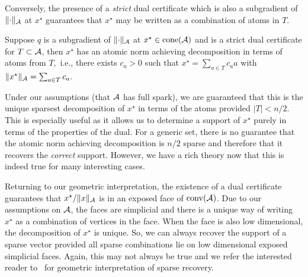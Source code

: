 Conversely, the presence of a \emph{strict} dual certificate which is also a
subgradient of $\lVert\cdot\rVert_{\mathcal{A}}$ at $x^\star$ guarantees that $x^\star$ may be
written as a combination of atoms in $T.$ 

\begin{prop}\label{prop:certificate-support}
Suppose $q$ is a subgradient of $\lVert\cdot\rVert_{\mathcal{A}}$ at $x^\star \in \operatorname{cone}(\mathcal{A})$
and is a strict dual certificate for $T \subset \mathcal{A}$, then $x^\star$ has an
atomic norm achieving decomposition in terms of atoms from $T,$ i.e., there
exists $c_a > 0$ such that $x^\star = \sum_{a \in T}c_a a$ with
$\lVert x^\star\rVert_{\mathcal{A}} = \sum_{a \in T}c_a$.
\end{prop}

Under our assumptions (that $\mathcal{A}$ has full spark), we are guaranteed that this is
the unique sparsest decomposition of $x^\star$ in terms of the atoms provided
$|T| < n/2$. This is especially useful as it allows us to determine a support of
$x^\star$ purely in terms of the properties of the dual. For a generic set,
there is no guarantee that the atomic norm achieving decomposition is $n/2$
sparse and therefore that it recovers the \emph{correct} support. However, we
have a rich theory now that this is indeed true for many interesting cases\cite{donoho2006most,candes06,candes2005decoding}.

Returning to our geometric interpretation, the existence of a dual certificate
guarantees that $x^\star/\lVert x\rVert_{\mathcal{A}}$ is in an exposed face of $\operatorname{conv}(\mathcal{A})$. Due
to our assumptions on $\mathcal{A}$, the faces are simplicial and there is a unique way
of writing $x^\star$ as a combination of vertices in the face. When the face is
also low dimensional, the decomposition of $x^\star$ is unique. So, we can
always recover the support of a sparse vector provided all sparse combinations
lie on low dimensional exposed simplicial faces. Again, this may not always be
true and we refer the interested reader to~\cite{neighborliness} for geometric
interpretation of sparse recovery.


